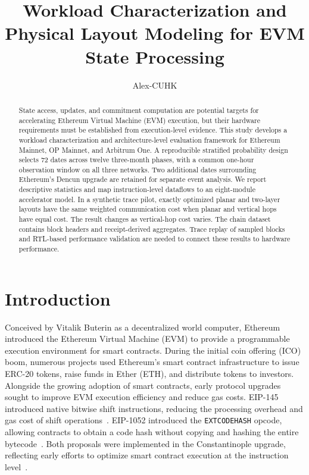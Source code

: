 \documentclass[runningheads]{llncs}
\begin{document}
\title{Workload Characterization and Physical Layout Modeling for EVM State Processing}
\author{Alex-CUHK}
\maketitle
\begin{abstract}
State access, updates, and commitment computation are potential targets for accelerating Ethereum Virtual Machine (EVM) execution, but their hardware requirements must be established from execution-level evidence. This study develops a workload characterization and architecture-level evaluation framework for Ethereum Mainnet, OP Mainnet, and Arbitrum One. A reproducible stratified probability design selects 72 dates across twelve three-month phases, with a common one-hour observation window on all three networks. Two additional dates surrounding Ethereum's Dencun upgrade are retained for separate event analysis. We report descriptive statistics and map instruction-level dataflows to an eight-module accelerator model. In a synthetic trace pilot, exactly optimized planar and two-layer layouts have the same weighted communication cost when planar and vertical hops have equal cost. The result changes as vertical-hop cost varies. The chain dataset contains block headers and receipt-derived aggregates. Trace replay of sampled blocks and RTL-based performance validation are needed to connect these results to hardware performance.
\end{abstract}

\section{Introduction}
Conceived by Vitalik Buterin as a decentralized world computer, Ethereum introduced the Ethereum Virtual Machine (EVM) to provide a programmable execution environment for smart contracts. During the initial coin offering (ICO) boom, numerous projects used Ethereum's smart contract infrastructure to issue ERC-20 tokens, raise funds in Ether (ETH), and distribute tokens to investors. Alongside the growing adoption of smart contracts, early protocol upgrades sought to improve EVM execution efficiency and reduce gas costs. EIP-145 introduced native bitwise shift instructions, reducing the processing overhead and gas cost of shift operations~\cite{eip145}. EIP-1052 introduced the \texttt{EXTCODEHASH} opcode, allowing contracts to obtain a code hash without copying and hashing the entire bytecode~\cite{eip1052}. Both proposals were implemented in the Constantinople upgrade, reflecting early efforts to optimize smart contract execution at the instruction level~\cite{constantinople}.
\end{document}
